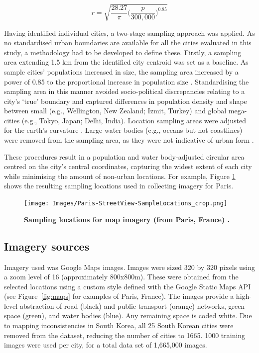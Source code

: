 \documentclass[final,3p,times,authoryear]{elsarticle}
\begin{document}
\begin{equation}
r = \sqrt{ \frac{28.27}{\pi} \bigg( \frac{p}{300,000}  \bigg)^{0.85} }
\end{equation}


Having identified individual cities, a two-stage sampling approach was applied. As no standardised urban boundaries are available for all the cities evaluated in this study, a methodology had to be developed to define these. Firstly, a sampling area extending 1.5 km from the identified city centroid \citep{UN2014} was set as a baseline. As sample cities' populations increased in size, the sampling area increased by a power of 0.85 to the proportional increase in population size \citep{Barthelemy2016}. Standardising the sampling area in this manner avoided socio-political discrepancies relating to a city's `true' boundary and captured differences in population density and shape between small (e.g., Wellington, New Zealand; Izmit, Turkey) and global mega-cities (e.g., Tokyo, Japan;  Delhi, India). Location sampling areas were adjusted for the earth's curvature \citep{Sinnott1984}. Large water-bodies (e.g., oceans but not coastlines) were removed from the sampling area, as they were not indicative of urban form . 

These procedures result in a population and water body-adjusted circular area centred on the city's central coordinates, capturing the widest extent of each city while minimising the amount of non-urban locations. For example, Figure \ref{fig:parissample} shows the resulting sampling locations used in collecting imagery for Paris. 

\begin{figure}[!htbp]
    \centering    
\texttt{[image: Images/Paris-StreetView-SampleLocations\_crop.png]}  
\caption{\bf Sampling locations for map imagery (from Paris, France) \citep{GoogleStatic2017}.}    
 \label{fig:parissample}  
\end{figure} 



\subsection{Imagery sources}\label{methodsimagery}
Imagery used was Google Maps images. Images were sized 320 by 320 pixels using a zoom level of 16 (approximately 800x800m). These were obtained from the selected locations using a custom style defined with the Google Static Maps API \citep{GoogleStatic2017} (see Figure~\ref{fig:maps} for examples of Paris, France). The images provide a high-level abstraction of road (black) and public transport (orange) networks, green space (green), and water bodies (blue). Any remaining space is coded white. Due to mapping inconsistencies in South Korea, all 25 South Korean cities were removed from the dataset, reducing the number of cities to 1665. 1000 training images were used per city, for a total data set of 1,665,000 images. 
\end{document}
